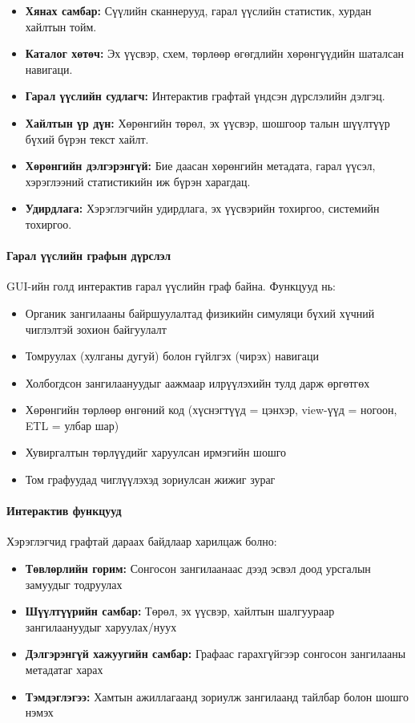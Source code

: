 \begin{itemize}
    \item \textbf{Хянах самбар:} Сүүлийн сканнерууд, гарал үүслийн статистик, хурдан хайлтын тойм.
    
    \item \textbf{Каталог хөтөч:} Эх үүсвэр, схем, төрлөөр өгөгдлийн хөрөнгүүдийн шаталсан навигаци.
    
    \item \textbf{Гарал үүслийн судлагч:} Интерактив графтай үндсэн дүрслэлийн дэлгэц.
    
    \item \textbf{Хайлтын үр дүн:} Хөрөнгийн төрөл, эх үүсвэр, шошгоор талын шүүлтүүр бүхий бүрэн текст хайлт.
    
    \item \textbf{Хөрөнгийн дэлгэрэнгүй:} Бие даасан хөрөнгийн метадата, гарал үүсэл, хэрэглээний статистикийн иж бүрэн харагдац.
    
    \item \textbf{Удирдлага:} Хэрэглэгчийн удирдлага, эх үүсвэрийн тохиргоо, системийн тохиргоо.
\end{itemize}

\paragraph{Гарал үүслийн графын дүрслэл}
GUI-ийн голд интерактив гарал үүслийн граф байна. Функцууд нь:

\begin{itemize}
    \item Органик зангилааны байршуулалтад физикийн симуляци бүхий хүчний чиглэлтэй зохион байгуулалт
    \item Томруулах (хулганы дугуй) болон гүйлгэх (чирэх) навигаци
    \item Холбогдсон зангилаануудыг аажмаар илрүүлэхийн тулд дарж өргөтгөх
    \item Хөрөнгийн төрлөөр өнгөний код (хүснэгтүүд = цэнхэр, view-үүд = ногоон, ETL = улбар шар)
    \item Хувиргалтын төрлүүдийг харуулсан ирмэгийн шошго
    \item Том графуудад чиглүүлэхэд зориулсан жижиг зураг
\end{itemize}

\paragraph{Интерактив функцууд}
Хэрэглэгчид графтай дараах байдлаар харилцаж болно:
\begin{itemize}
    \item \textbf{Төвлөрлийн горим:} Сонгосон зангилаанаас дээд эсвэл доод урсгалын замуудыг тодруулах
    \item \textbf{Шүүлтүүрийн самбар:} Төрөл, эх үүсвэр, хайлтын шалгуураар зангилаануудыг харуулах/нуух
    \item \textbf{Дэлгэрэнгүй хажуугийн самбар:} Графаас гарахгүйгээр сонгосон зангилааны метадатаг харах
    \item \textbf{Тэмдэглэгээ:} Хамтын ажиллагаанд зориулж зангилаанд тайлбар болон шошго нэмэх
\end{itemize}


